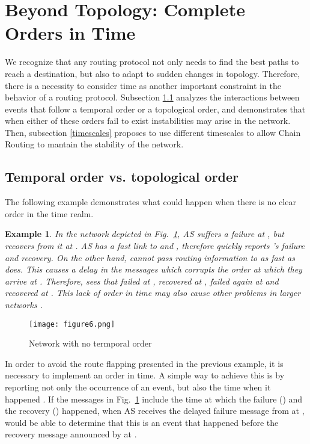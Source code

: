 \documentclass[5p,twocolumn]{elsarticle}
\newtheorem{example}{Example}
\begin{document}
\section{Beyond Topology: Complete Orders in Time}\label{comp_orders_in_time}
 
We recognize that any routing protocol not only needs to find the best paths to reach a destination, but also to adapt to sudden changes in topology. Therefore, there is a necessity to consider time as another important constraint in the behavior of a routing protocol. Subsection \ref{temp_ord_topo_ord} analyzes the interactions between events that follow a temporal order or a topological order, and demonstrates that when either of these orders fail to exist instabilities may arise in the network. Then, subsection \ref{timescales} proposes to use different timescales to allow Chain Routing to mantain the stability of the network.


\subsection{Temporal order vs. topological order}\label{temp_ord_topo_ord}

The following example demonstrates what could happen when there is no clear order in the time realm.

\begin{example}
In the network depicted in Fig.\ \ref{fig:73_TempOrder}, AS  suffers a failure at , but recovers from it at . AS  has a fast link to  and , therefore  quickly reports 's failure and recovery. On the other hand,  cannot pass routing information to  as fast as  does. This causes a delay in the messages which corrupts the order at which they arrive at . Therefore,  sees that  failed at , recovered at , failed again at  and recovered at . This lack of order in time may also cause other problems in larger networks \cite{Mao2002}.
\end{example}

\begin{figure}[!t]
	\centering
		\texttt{[image: figure6.png]}
	\caption{Network with no termporal order}
	\label{fig:73_TempOrder}
\end{figure}

In order to avoid the route flapping presented in the previous example, it is necessary to implement an order in time. A simple way to achieve this is by reporting not only the occurrence of an event, but also the time when it happened \cite{Chandrashekar2005, Pei2005}. If the messages in Fig.\ \ref{fig:73_TempOrder} include the time at which the failure () and the recovery () happened, when AS  receives the delayed failure message from  at ,  would be able to determine that this is an event that happened before the recovery message announced by  at .
\end{document}
